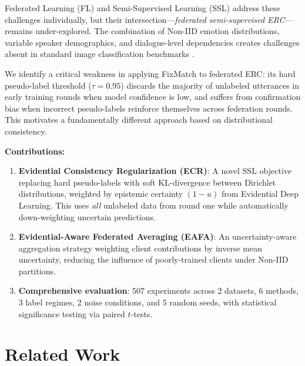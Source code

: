 \documentclass[letterpaper]{article}
\newcommand{\ecr}{ECR}
\newcommand{\eafa}{EAFA}
\begin{document}
Federated Learning (FL) \cite{mcmahan2017communication} and Semi-Supervised Learning
(SSL) \cite{sohn2020fixmatch} address these challenges individually, but their
intersection---\textit{federated semi-supervised ERC}---remains under-explored.
The combination of Non-IID emotion distributions, variable speaker demographics,
and dialogue-level dependencies creates challenges absent in standard image
classification benchmarks \cite{jeong2021federated}.

We identify a critical weakness in applying FixMatch \cite{sohn2020fixmatch} to
federated ERC: its hard pseudo-label threshold ($\tau = 0.95$) discards the
majority of unlabeled utterances in early training rounds when model confidence
is low, and suffers from confirmation bias when incorrect pseudo-labels reinforce
themselves across federation rounds. This motivates a fundamentally different
approach based on distributional consistency.

\textbf{Contributions:}
\begin{enumerate}
\item \textbf{Evidential Consistency Regularization (\ecr{})}: A novel SSL
objective replacing hard pseudo-labels with soft KL-divergence between Dirichlet
distributions, weighted by epistemic certainty $(1{-}u)$ from Evidential Deep
Learning. This uses \textit{all} unlabeled data from round one while automatically
down-weighting uncertain predictions.

\item \textbf{Evidential-Aware Federated Averaging (\eafa{})}: An uncertainty-aware
aggregation strategy weighting client contributions by inverse mean uncertainty,
reducing the influence of poorly-trained clients under Non-IID partitions.

\item \textbf{Comprehensive evaluation}: 507 experiments across 2 datasets,
6 methods, 3 label regimes, 2 noise conditions, and 5 random seeds, with
statistical significance testing via paired $t$-tests.
\end{enumerate}

\section{Related Work}
\end{document}
